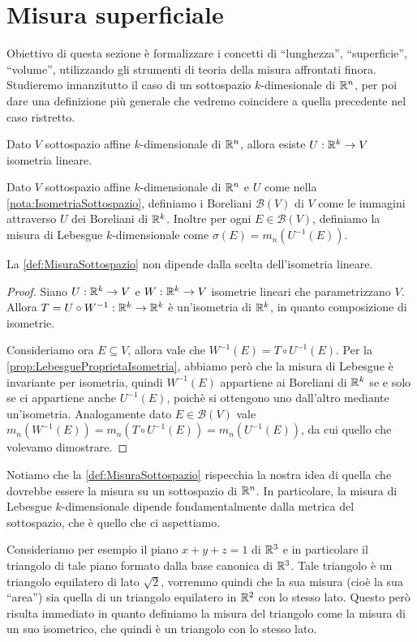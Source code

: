 \section{Misura superficiale}
Obiettivo di questa sezione è formalizzare i concetti di ``lunghezza'', ``superficie'', ``volume'', utilizzando gli strumenti di teoria della misura affrontati finora. Studieremo innanzitutto il caso di un sottospazio $k$-dimesionale di $\mathbb R^n$, per poi dare una definizione più generale che vedremo coincidere a quella precedente nel caso ristretto.

\begin{remark}\label{nota:IsometriaSottospazio}
	Dato $V$ sottospazio affine $k$-dimensionale di $\mathbb R^n$, allora esiste $U:\mathbb R^k\to V$ isometria lineare.
\end{remark}

\begin{definition}\label{def:MisuraSottospazio}
	Dato $V$ sottospazio affine $k$-dimensionale di $\mathbb R^n$ e $U$ come nella \cref{nota:IsometriaSottospazio}, definiamo i Boreliani $\mathcal{B}(V)$ di $V$ come le immagini attraverso $U$ dei Boreliani di $\mathbb R^k$. Inoltre per ogni $E\in\mathcal{B}(V)$, definiamo la misura di Lebesgue $k$-dimensionale come $\sigma(E)=m_n(U^{-1}(E))$.
\end{definition}

\begin{remark}
	La \cref{def:MisuraSottospazio} non dipende dalla scelta dell'isometria lineare.
\end{remark}
\begin{proof}
	Siano $U:\mathbb R^k\to V$ e $W:\mathbb R^k\to V$ isometrie lineari che parametrizzano $V$. Allora $T=U\circ W^{-1}:\mathbb R^k\to\mathbb R^k$ è un'isometria di $\mathbb R^k$, in quanto composizione di isometrie.
	
	Consideriamo ora $E\subseteq V$, allora vale che $W^{-1}(E)=T\circ U^{-1}(E)$. Per la \cref{prop:LebesgueProprietaIsometria}, abbiamo però che la misura di Lebesgue è invariante per isometria, quindi $W^{-1}(E)$ appartiene ai Boreliani di $\mathbb R^k$ se e solo se ci appartiene anche $U^{-1}(E)$, poichè si ottengono uno dall'altro mediante un'isometria. Analogamente dato $E\in\mathcal{B}(V)$ vale $m_n(W^{-1}(E))=m_n(T\circ U^{-1}(E))=m_n(U^{-1}(E))$, da cui quello che volevamo dimostrare.
\end{proof}

Notiamo che la \cref{def:MisuraSottospazio} rispecchia la nostra idea di quella che dovrebbe essere la misura su un sottospazio di $\mathbb R^n$. In particolare, la misura di Lebesgue $k$-dimensionale dipende fondamentalmente dalla metrica del sottospazio, che è quello che ci aspettiamo.

Consideriamo per esempio il piano $x+y+z=1$ di $\mathbb R^3$ e in particolare il triangolo di tale piano formato dalla base canonica di $\mathbb R^3$. Tale triangolo è un triangolo equilatero di lato $\sqrt{2}$, vorremmo quindi che la sua misura (cioè la sua ``area'') sia quella di un triangolo equilatero in $\mathbb R^2$ con lo stesso lato. Questo però risulta immediato in quanto definiamo la misura del triangolo come la misura di un suo isometrico, che quindi è un triangolo con lo stesso lato.


